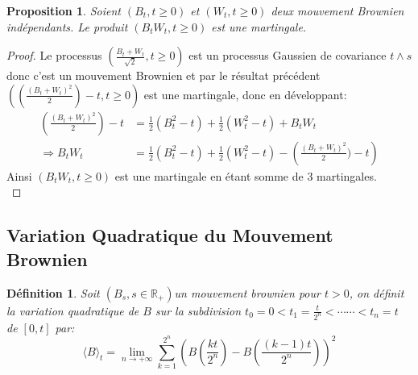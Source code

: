 \documentclass[A4paper,12pt]{report}
\newtheorem{proposition}{Proposition}[chapter]
\newtheorem{definition}{D\'efinition}[chapter]
\begin{document}
\begin{proposition}
Soient $\left(B_{t}, t\geq0 \right)$ et  $\left(W_{t}, t\geq0 \right)$ deux mouvement Brownien indépendants. Le produit  $\left(B_{t}W_{t}, t\geq0 \right)$ est une martingale. 
\end{proposition}
\begin{proof}
Le processus $\left(\frac{B_t + W_t}{\sqrt{2}}, t\geq0\right)$ est un processus Gaussien de covariance $t\wedge s$ donc c'est un mouvement Brownien et par le résultat précédent$\left((\frac{(B_t + W_t)^2}{2})-t, t\geq0\right)$ est une martingale, donc en développant:
\begin{align*}
(\frac{(B_t + W_t)^2}{2})-t &= \frac{1}{2} (B_{t}^2 -t) + \frac{1}{2}(W_{t}^2 -t)+ B_t W_t\\
 \Rightarrow B_t W_t &= \frac{1}{2} (B_{t}^2 -t) + \frac{1}{2}(W_{t}^2 -t)-\left(\frac{(B_t + W_t)^2}{2})-t\right)
\end{align*}
Ainsi $\left(B_t W_t, t\geq0\right)$  est une martingale en étant somme de 3 martingales.\\
\end{proof}
\subsection{Variation Quadratique du Mouvement Brownien}

\begin{definition}
Soit $\left(B_{s}, s \in \mathbb{R}_{+}\right)$un mouvement brownien pour $t>0$, on définit la variation quadratique de $B$ sur la subdivision $t_{0}=0<t_{1}=\frac{t}{2^{n}}<\cdots \cdots<t_{n}=t$ de $[0, t]$ par:
$$
\langle B\rangle_{t}=\lim_{n\rightarrow +\infty }\sum_{k=1}^{2^{n}}\left(B\left(\frac{k t}{2^{n}}\right)-B\left(\frac{(k-1) t}{2^{n}}\right)\right)^{2}
$$
\end{definition}
\end{document}
